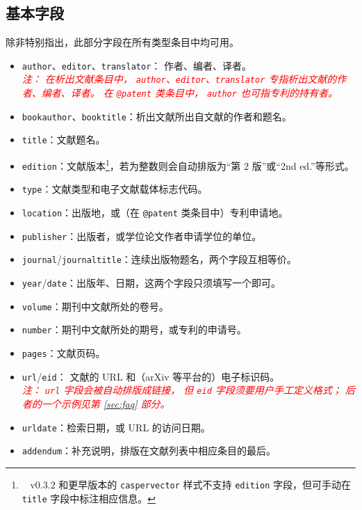 \documentclass[UTF8]{ctexart}
\newcommand{\myemph}[1]{\emph{\textcolor{red}{#1}}}
\begin{document}
\subsection{基本字段}

除非特别指出，此部分字段在所有类型条目中均可用。

\begin{itemize}
	\item \verb|author|、\verb|editor|、\verb|translator|：
		作者、编者、译者。\\\myemph{%
			注：
			在析出文献条目中，%
			\texttt{author}、\texttt{editor}、\texttt{translator}
			专指析出文献的作者、编者、译者。
			在 \texttt{@patent} 类条目中，%
			\texttt{author} 也可指专利的持有者。%
		}
	\item \verb|bookauthor|、\verb|booktitle|：析出文献所出自文献的作者和题名。
	\item \verb|title|：文献题名。
	\item \verb|edition|：文献版本\footnote{\ %
		v0.3.2 和更早版本的 \texttt{caspervector} 样式不支持 \texttt{edition}
		字段，但可手动在 \texttt{title} 字段中标注相应信息。%
	}，若为整数则会自动排版为“第 2 版”或“2nd ed.”等形式。
	\item \verb|type|：文献类型和电子文献载体标志代码\supercite{gbt7714-2005}。
	\item \verb|location|：出版地，或（在 \verb|@patent| 类条目中）专利申请地。
	\item \verb|publisher|：出版者，或学位论文作者申请学位的单位。
	\item \verb|journal|/\verb|journaltitle|：连续出版物题名，两个字段互相等价。
	\item \verb|year|/\verb|date|：出版年、日期，这两个字段只须填写一个即可。
	\item \verb|volume|：期刊中文献所处的卷号。
	\item \verb|number|：期刊中文献所处的期号，或专利的申请号。
	\item \verb|pages|：文献页码。
	\item \verb|url|/\verb|eid|：
		文献的 URL 和（arXiv 等平台的）电子标识码。\\\myemph{%
			注：%
			\texttt{url} 字段会被自动排版成链接，
			但 \texttt{eid} 字段须要用户手工定义格式；
			后者的一个示例见第 \ref{sec:faq} 部分。%
		}
	\item \verb|urldate|：检索日期，或 URL 的访问日期。
	\item \verb|addendum|：补充说明，排版在文献列表中相应条目的最后。
\end{itemize}
\end{document}
